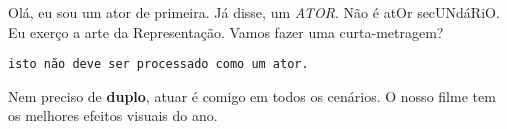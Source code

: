 \documentclass{article}
\begin{document}
Olá, eu sou um ator de primeira. Já disse, um \emph{ATOR}. Não é atOr secUNdáRiO.
Eu exerço a arte da Representação.
Vamos fazer uma curta-metragem?
\begin{verbatim}
isto não deve ser processado como um ator.
\end{verbatim}
Nem preciso de \textbf{duplo}, atuar é comigo em todos os cenários.
O nosso filme tem os melhores efeitos visuais do ano.
\end{document}
